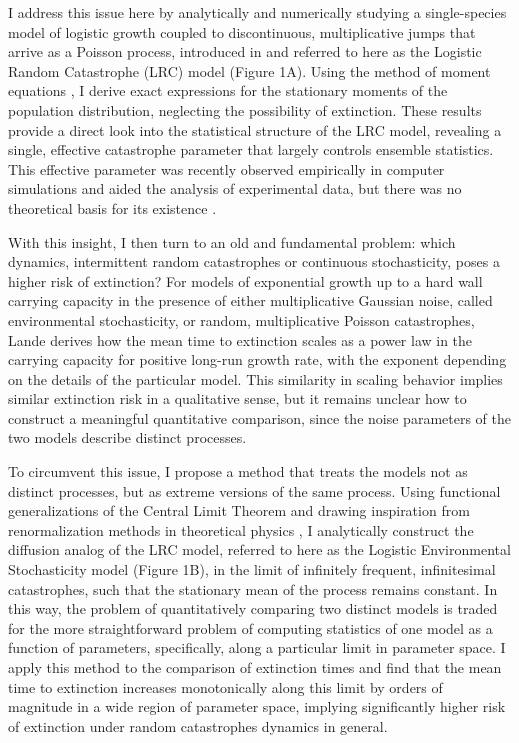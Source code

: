 I address this issue here by  analytically and numerically studying a single-species model of logistic growth coupled to discontinuous, multiplicative jumps that arrive as a Poisson process, introduced in \cite{hanson1981} and referred to here as the Logistic Random Catastrophe (LRC) model (Figure 1A). Using the method of moment equations \cite{bover1978moment}, I derive exact expressions for the stationary moments of the population distribution, neglecting the possibility of extinction.  These results provide a direct look into the statistical structure of the LRC model, revealing a single, effective catastrophe parameter that largely controls ensemble statistics.  This effective parameter was recently observed empirically in computer simulations and aided the analysis of experimental data, but there was no theoretical basis for its existence \cite{wilesPLOS2016}.  

With this insight, I then turn to an old and fundamental problem: which dynamics, intermittent random catastrophes or continuous stochasticity, poses a higher risk of extinction?  For models of exponential growth up to a hard wall carrying capacity in the presence of either multiplicative Gaussian noise, called environmental stochasticity, or random, multiplicative Poisson catastrophes, Lande \cite{lande1993risks}  derives how the mean time to extinction scales as a power law in the carrying capacity for positive long-run growth rate, with the exponent depending on the details of the particular model.  This similarity in scaling behavior implies similar extinction risk in a qualitative sense, but it remains unclear how to construct a meaningful quantitative comparison, since the noise parameters of the two models describe distinct processes.  

To circumvent this issue, I propose a method that treats the models not as distinct processes, but as extreme versions of the same process.  Using functional generalizations of the Central Limit Theorem \cite{jacod2013limit} and drawing inspiration from renormalization methods in theoretical physics \cite{peskin1995quantum,jona1975renormalization}, I analytically construct the diffusion analog of the LRC model, referred to here as the Logistic Environmental Stochasticity model (Figure 1B), in the limit of infinitely frequent, infinitesimal catastrophes, such that the stationary mean of the process remains constant.  In this way, the problem of quantitatively comparing two distinct models is traded for the more straightforward problem of computing statistics of one model as a function of parameters, specifically, along a particular limit in parameter space.  I apply this method to the comparison of extinction times and find that the mean time to extinction increases monotonically along this limit by orders of magnitude in a wide region of parameter space, implying significantly higher risk of extinction under random catastrophes dynamics in general.


